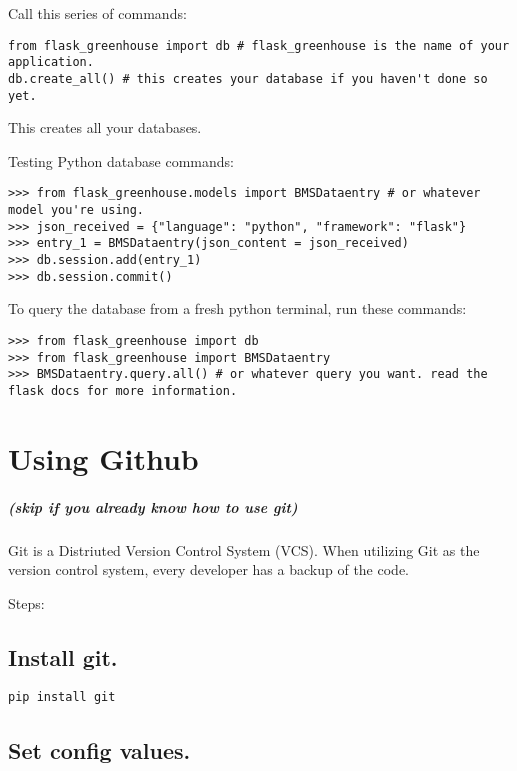 Call this series of commands:

\begin{verbatim}
from flask_greenhouse import db # flask_greenhouse is the name of your application.  
db.create_all() # this creates your database if you haven't done so yet.
\end{verbatim}

This creates all your databases.

Testing Python database commands:

\begin{verbatim}
>>> from flask_greenhouse.models import BMSDataentry # or whatever model you're using.
>>> json_received = {"language": "python", "framework": "flask"}
>>> entry_1 = BMSDataentry(json_content = json_received)
>>> db.session.add(entry_1)
>>> db.session.commit()
\end{verbatim}

To query the database from a fresh python terminal, run these commands:

\begin{verbatim}
>>> from flask_greenhouse import db
>>> from flask_greenhouse import BMSDataentry
>>> BMSDataentry.query.all() # or whatever query you want. read the flask docs for more information.
\end{verbatim}

\section{Using Github}\label{using-github}

\subparagraph{(skip if you already know how to use
git)}\label{skip-if-you-already-know-how-to-use-git}

Git is a Distriuted Version Control System (VCS). When utilizing Git as
the version control system, every developer has a backup of the code.

Steps:

\subsection{Install git.}\label{install-git.}

\begin{verbatim}
pip install git
\end{verbatim}

\subsection{Set config values.}\label{set-config-values.}

